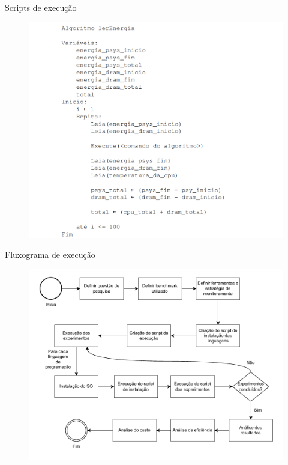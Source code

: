 \begin{frame}{Scripts de execução}
    \begin{figure}
        \centering
        \includegraphics[width=0.55\linewidth]{images/scriptMonitor.png}
    \end{figure}
\end{frame}

\begin{frame}{Fluxograma de execução}
    \begin{figure}
        \centering
        \includegraphics[width=0.65\linewidth]{images/fluxograma.pdf}
    \end{figure}
\end{frame}